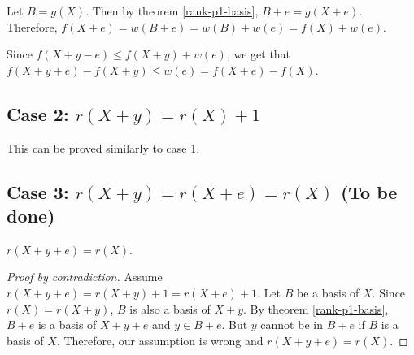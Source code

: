 Let $B = g(X)$. Then by theorem \ref{rank-p1-basis}, $B+e = g(X+e)$.
Therefore, $f(X+e) = w(B+e) = w(B) + w(e) = f(X) + w(e)$.

Since $f(X+y-e) \le f(X+y) + w(e)$, we get that
$f(X+y+e) - f(X+y) \le w(e) = f(X+e) - f(X)$.

\subsection[Case 2: r(X+y) = r(X) + 1]{Case 2: $r(X+y) = r(X) + 1$}

This can be proved similarly to case 1.

\subsection[Case 3: r(X+y) = r(X+e) = r(X) (To be done)]{Case 3: $r(X+y) = r(X+e) = r(X)$ (To be done)}

\begin{theorem} $r(X+y+e) = r(X)$. \end{theorem}
\begin{proof}[Proof by contradiction]
Assume $r(X+y+e) = r(X+y) + 1 = r(X+e) + 1$.
Let $B$ be a basis of $X$.
Since $r(X) = r(X+y)$, $B$ is also a basis of $X+y$.
By theorem \ref{rank-p1-basis}, $B+e$ is a basis of $X+y+e$ and $y \in B+e$.
But $y$ cannot be in $B+e$ if $B$ is a basis of $X$.
Therefore, our assumption is wrong and $r(X+y+e) = r(X)$.
\end{proof}


